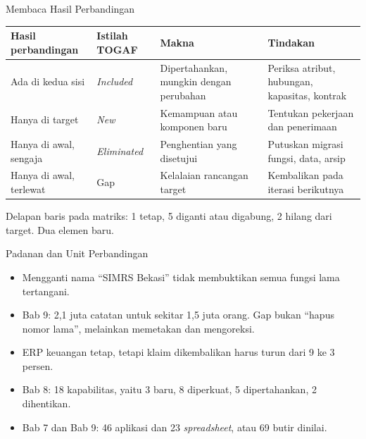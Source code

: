 \documentclass[aspectratio=169, table, 12pt]{beamer}
\begin{document}
\begin{frame}{{\Large Membaca Hasil Perbandingan}}
  \footnotesize
  \begin{tabularx}{\textwidth}{>{\raggedright\arraybackslash}p{3.6cm}>{\raggedright\arraybackslash}p{2.1cm}>{\raggedright\arraybackslash}X>{\raggedright\arraybackslash}X}
    \hline
    \textbf{Hasil perbandingan} & \textbf{Istilah TOGAF} & \textbf{Makna} & \textbf{Tindakan} \\ \hline
    Ada di kedua sisi & \textit{Included} & Dipertahankan, mungkin dengan perubahan & Periksa atribut, hubungan, kapasitas, kontrak \\ \hline
    Hanya di target & \textit{New} & Kemampuan atau komponen baru & Tentukan pekerjaan dan penerimaan \\ \hline
    Hanya di awal, sengaja & \textit{Eliminated} & Penghentian yang disetujui & Putuskan migrasi fungsi, data, arsip \\ \hline
    Hanya di awal, terlewat & Gap & Kelalaian rancangan target & Kembalikan pada iterasi berikutnya \\ \hline
  \end{tabularx}

  \vspace{8pt}
  \small Delapan baris pada matriks: 1 tetap, 5 diganti atau digabung, 2 hilang dari target. Dua elemen baru.
\end{frame}

\begin{frame}{{\Large Padanan dan Unit Perbandingan}}
  \vspace{10pt}
  \begin{itemize}
    \item Mengganti nama ``SIMRS Bekasi'' tidak membuktikan semua fungsi lama tertangani.
    \item Bab 9: 2,1 juta catatan untuk sekitar 1,5 juta orang. Gap bukan ``hapus nomor lama'',
          melainkan memetakan dan mengoreksi.
    \item ERP keuangan tetap, tetapi klaim dikembalikan harus turun dari 9 ke 3 persen.
    \item Bab 8: 18 kapabilitas, yaitu 3 baru, 8 diperkuat, 5 dipertahankan, 2 dihentikan.
    \item Bab 7 dan Bab 9: 46 aplikasi dan 23 \textit{spreadsheet}, atau 69 butir dinilai.
  \end{itemize}
\end{frame}
\end{document}
